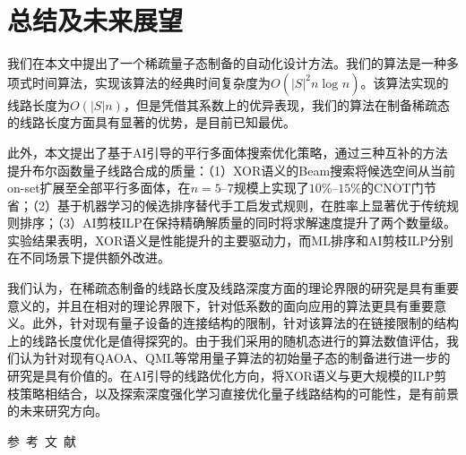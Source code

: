 \documentclass[10.5pt,compsoc,UTF8]{CjC}
\newcommand{\heiti}{\CJKfamily{STHeiti}}
\theoremstyle{mystyle}
\begin{document}


\section{\heiti 总结及未来展望}

我们在本文中提出了一个稀疏量子态制备的自动化设计方法。我们的算法是一种多项式时间算法，实现该算法的经典时间复杂度为$O\left ( \left |  S\right |^2 n \log_{}{n}  \right ) $。该算法实现的线路长度为$O\left ( \left |  S\right | n \right ) $，但是凭借其系数上的优异表现，我们的算法在制备稀疏态的线路长度方面具有显著的优势，是目前已知最优。

此外，本文提出了基于AI引导的平行多面体搜索优化策略，通过三种互补的方法提升布尔函数量子线路合成的质量：（1）XOR语义的Beam搜索将候选空间从当前on-set扩展至全部平行多面体，在$n=5$--$7$规模上实现了$10\%$--$15\%$的CNOT门节省；（2）基于机器学习的候选排序替代手工启发式规则，在胜率上显著优于传统规则排序；（3）AI剪枝ILP在保持精确解质量的同时将求解速度提升了两个数量级。实验结果表明，XOR语义是性能提升的主要驱动力，而ML排序和AI剪枝ILP分别在不同场景下提供额外改进。

我们认为，在稀疏态制备的线路长度及线路深度方面的理论界限的研究是具有重要意义的，并且在相对的理论界限下，针对低系数的面向应用的算法更具有重要意义。此外，针对现有量子设备的连接结构的限制，针对该算法的在链接限制的结构上的线路长度优化是值得探究的。由于我们采用的随机态进行的算法数值评估，我们认为针对现有QAOA、QML等常用量子算法的初始量子态的制备进行进一步的研究是具有价值的。在AI引导的线路优化方向，将XOR语义与更大规模的ILP剪枝策略相结合，以及探索深度强化学习直接优化量子线路结构的可能性，是有前景的未来研究方向。



\newpage

\vspace {10mm}
\centerline
{\textsf{参~考~文~献}}
 \addtolength{\itemsep}{-1em}
\vspace {1.5mm}





\end{document}
